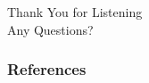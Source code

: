 \documentclass{beamer}
\begin{document}
\begin{frame}{}
\begin{center}
    \Large Thank You for Listening\\[6mm]
    \Large Any Questions? 
\end{center}
\end{frame}
\begin{frame}[allowframebreaks]
        \frametitle{References}
        
\end{frame}
\end{document}
